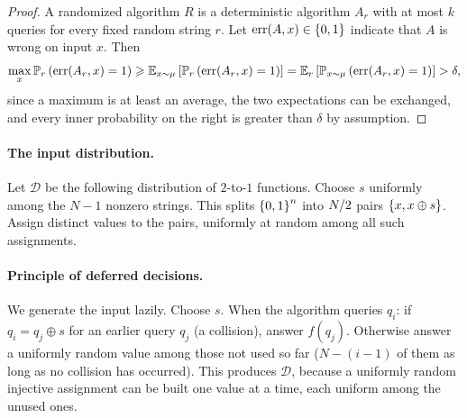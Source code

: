\begin{proof}
    A randomized algorithm $R$ is a deterministic algorithm $A_r$ with at most $k$ queries for every
    fixed random string $r$. Let $\mathrm{err}(A, x) \in \left\lbrace0, 1\right\rbrace$ indicate that $A$ is wrong on
    input $x$. Then
    \[\max_{x} \prob[r]{\mathrm{err}(A_r, x) = 1}
        \geq \expectation[x \sim \mu]{\prob[r]{\mathrm{err}(A_r, x) = 1}}
        = \expectation[r]{\prob[x \sim \mu]{\mathrm{err}(A_r, x) = 1}}
        > \delta,\]
    since a maximum is at least an average, the two expectations can be exchanged, and every inner
    probability on the right is greater than $\delta$ by assumption.
\end{proof}

\paragraph{The input distribution.} Let $\mathcal{D}$ be the following distribution of $2$-to-$1$
functions. Choose $s$ uniformly among the $N - 1$ nonzero strings. This splits $\left\lbrace0,1\right\rbrace^n$ into
$N/2$ pairs $\left\lbrace x, x \oplus s\right\rbrace$. Assign distinct values to the pairs, uniformly at
random among all such assignments.

\paragraph{Principle of deferred decisions.} We generate the input lazily. Choose $s$. When the
algorithm queries $q_i$: if $q_i = q_j \oplus s$ for an earlier query $q_j$ (a collision), answer
$f(q_j)$. Otherwise answer a uniformly random value among those not used so far ($N - (i-1)$ of them
as long as no collision has occurred). This produces $\mathcal{D}$, because a uniformly random
injective assignment can be built one value at a time, each uniform among the unused ones.

